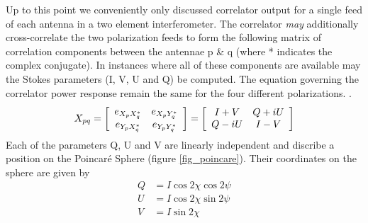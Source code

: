 \documentclass[a4paper,10pt]{report}
\begin{document}
Up to this point we conveniently only discussed correlator output for a single feed of each antenna in a two element interferometer. The correlator \textit{may} additionally cross-correlate the two polarization feeds to 
form the following matrix of correlation components between the antennae p \& q (where * indicates the complex conjugate). In instances where all of these components are available may the Stokes parameters (I, V, U and Q) be computed. 
The equation governing the correlator power response remain the same for the four different polarizations.  \cite{taylor1999synthesis}.
\begin{equation}
X_{pq} = \left[\begin{array}{c c}
     e_{X_pX_q^*} & e_{X_pY_q^*} \\
     e_{Y_pX_q^*} & e_{Y_pY_q^*} \\
    \end{array}\right] = 
    \left[\begin{array}{c c}
     I + V & Q + iU \\
     Q - iU & I - V \\
    \end{array}\right]
\end{equation}
Each of the parameters Q, U and V are linearly independent and discribe a position on the Poincar\'e Sphere (figure \ref{fig_poincare}). Their coordinates on the sphere are given by
\begin{equation}
  \begin{split}
    Q &= I\cos{2\chi}\cos{2\psi}\\
    U &= I\cos{2\chi}\sin{2\psi}\\
    V &= I\sin{2\chi}\\
  \end{split}
\end{equation}
\end{document}
